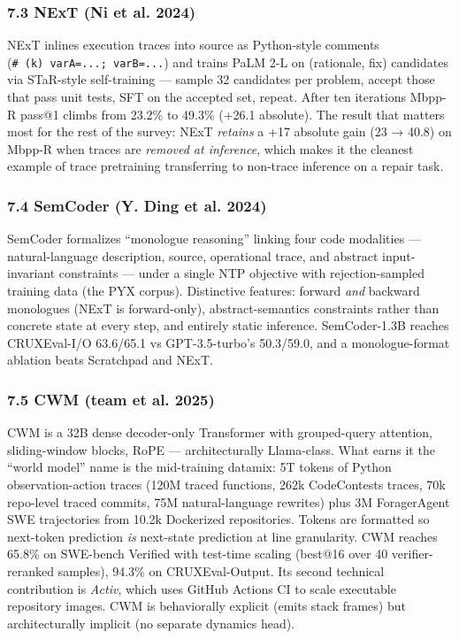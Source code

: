 \documentclass{article}
\begin{document}
\hypertarget{next-arxiv2404_14662}{%
\subsubsection{7.3 NExT (Ni et al. 2024)}\label{next-arxiv2404_14662}}

NExT inlines execution traces into source as Python-style comments
(\texttt{\#\ (k)\ varA=...;\ varB=...}) and trains PaLM 2-L on
(rationale, fix) candidates via STaR-style self-training --- sample 32
candidates per problem, accept those that pass unit tests, SFT on the
accepted set, repeat. After ten iterations Mbpp-R pass@1 climbs from
23.2\% to 49.3\% (+26.1 absolute). The result that matters most for the
rest of the survey: NExT \emph{retains} a +17 absolute gain (23 → 40.8)
on Mbpp-R when traces are \emph{removed at inference}, which makes it
the cleanest example of trace pretraining transferring to non-trace
inference on a repair task.

\hypertarget{semcoder-arxiv2406_01006}{%
\subsubsection{7.4 SemCoder (Y. Ding et al.
2024)}\label{semcoder-arxiv2406_01006}}

SemCoder formalizes ``monologue reasoning'' linking four code modalities
--- natural-language description, source, operational trace, and
abstract input-invariant constraints --- under a single NTP objective
with rejection-sampled training data (the PYX corpus). Distinctive
features: forward \emph{and} backward monologues (NExT is forward-only),
abstract-semantics constraints rather than concrete state at every step,
and entirely static inference. SemCoder-1.3B reaches CRUXEval-I/O
63.6/65.1 vs GPT-3.5-turbo's 50.3/59.0, and a monologue-format ablation
beats Scratchpad and NExT.

\hypertarget{cwm-arxiv2510_02387}{%
\subsubsection{7.5 CWM (team et al. 2025)}\label{cwm-arxiv2510_02387}}

CWM is a 32B dense decoder-only Transformer with grouped-query
attention, sliding-window blocks, RoPE --- architecturally Llama-class.
What earns it the ``world model'' name is the mid-training datamix: 5T
tokens of Python observation-action traces (120M traced functions, 262k
CodeContests traces, 70k repo-level traced commits, 75M natural-language
rewrites) plus 3M ForagerAgent SWE trajectories from 10.2k Dockerized
repositories. Tokens are formatted so next-token prediction \emph{is}
next-state prediction at line granularity. CWM reaches 65.8\% on
SWE-bench Verified with test-time scaling (best@16 over 40
verifier-reranked samples), 94.3\% on CRUXEval-Output. Its second
technical contribution is \emph{Activ}, which uses GitHub Actions CI to
scale executable repository images. CWM is behaviorally explicit (emits
stack frames) but architecturally implicit (no separate dynamics head).
\end{document}
